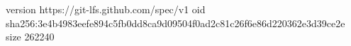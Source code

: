version https://git-lfs.github.com/spec/v1
oid sha256:3e4b4983eefe894c5fb0dd8ca9d09504f0ad2c81c26f6e86d220362e3d39ce2e
size 262240
